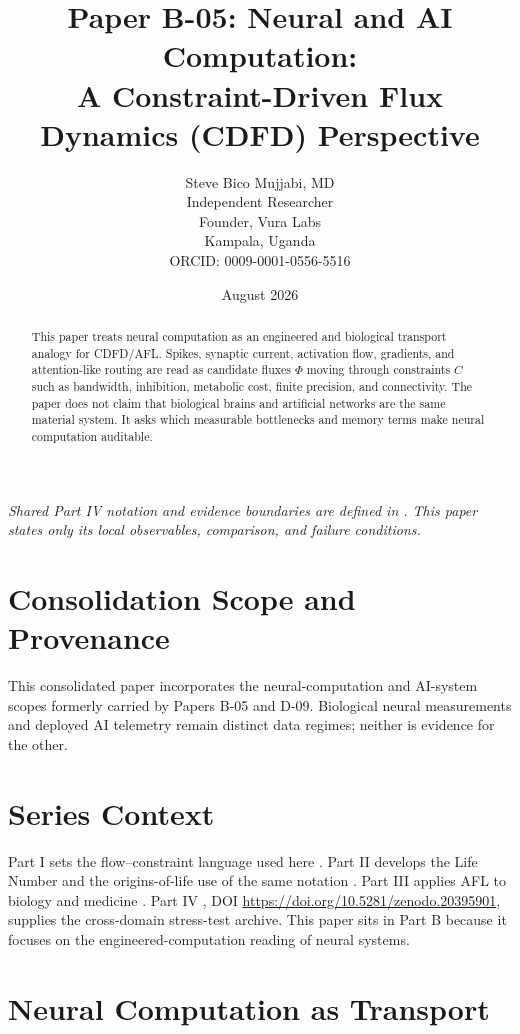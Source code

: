 \documentclass[12pt,a4paper]{article}
\title{\textbf{Paper B-05: Neural and AI Computation:\\ A Constraint-Driven Flux Dynamics (CDFD) Perspective}}
\author{Steve Bico Mujjabi, MD\\
\small Independent Researcher\\
\small Founder, Vura Labs\\
\small Kampala, Uganda\\
\small ORCID: 0009-0001-0556-5516}
\date{August 2026}
\begin{document}
\maketitle

\noindent\textit{Shared Part IV notation and evidence boundaries are defined in . This paper states only its local observables, comparison, and failure conditions.}

\begin{abstract}
This paper treats neural computation as an engineered and biological transport
analogy for CDFD/AFL. Spikes, synaptic current, activation flow, gradients, and
attention-like routing are read as candidate fluxes $\Phi$ moving through
constraints $C$ such as bandwidth, inhibition, metabolic cost, finite precision,
and connectivity. The paper does not claim that biological brains and artificial
networks are the same material system. It asks which measurable bottlenecks and
memory terms make neural computation auditable.
\end{abstract}
\section*{Consolidation Scope and Provenance}
This consolidated paper incorporates the neural-computation and AI-system scopes formerly carried by Papers B-05 and D-09. Biological neural measurements and deployed AI telemetry remain distinct data regimes; neither is evidence for the other.


\section{Series Context}

Part I sets the flow--constraint language used here \cite{MujjabiPartI2026}.
Part II develops the Life Number and the origins-of-life use of the same notation
\cite{MujjabiPartII2026}. Part III applies AFL to biology and medicine
\cite{MujjabiPartIII2026}. Part IV \cite{MujjabiPartIV2026}, DOI \url{https://doi.org/10.5281/zenodo.20395901}, supplies the
cross-domain stress-test archive. This paper sits in Part B because it focuses
on the engineered-computation reading of neural systems.

\section{Neural Computation as Transport}
\end{document}
